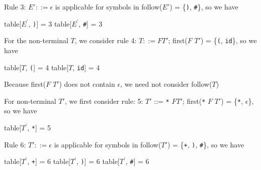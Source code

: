 \documentclass[8pt,a4paper,compress,handout]{beamer}
\newcommand{\mm}[1]{$#1$}
\newcommand{\expo}[2]{$#1^{#2}$}
\newenvironment{spaced}
{
\smallskip
\hspace{.5cm}
\begin{minipage}[c]{\textwidth}
}
{
\end{minipage}
\smallskip
}
\begin{document}
\begin{frame}[fragile]
\pause

Rule 3: $E' ::= \epsilon$ is applicable for symbols in follow($E'$) =  \{\lstinline{)}, \lstinline{#}\}, so we have

\text{ }
\begin{spaced}
\begin{production}
table[\expo{E}{\prime}, \lstinline{)}] = 3
table[\expo{E}{\prime}, \lstinline{#}] = 3
\end{production}
\end{spaced}

\pause

For the non-terminal $T$, we consider rule 4: $T  ::= F T'$; first($F$ $T'$) = \{\lstinline{(}, \lstinline{id}\}, so we have

\text{ }
\begin{spaced}
\begin{production}
table[\mm{T}, \lstinline{(}] = 4
table[\mm{T}, \lstinline{id}] = 4
\end{production}
\end{spaced}

\pause

Because first($F$ $T'$) does not contain $\epsilon$, we need not consider follow($T$)

\pause
\bigskip

For non-terminal $T'$, we first consider rule: 5: $T'$ ::= \lstinline{*} $F T'$; first(\lstinline{*} $F$ $T'$) = \{\lstinline{*}, $\epsilon$\}, so we have

\text{ }
\begin{spaced}
\begin{production}
table[\expo{T}{\prime}, \lstinline{*}] = 5
\end{production}
\end{spaced}

\pause

Rule 6: $T' ::= \epsilon$ is applicable for symbols in follow($T'$) = \{\lstinline{+}, \lstinline{)}, \lstinline{#}\}, so we have

\text{ }
\begin{spaced}
\begin{production}
table[\expo{T}{\prime}, \lstinline{+}] = 6
table[\expo{T}{\prime}, \lstinline{)}] = 6
table[\expo{T}{\prime}, \lstinline{#}] = 6
\end{production}
\end{spaced}
\end{frame}
\end{document}
